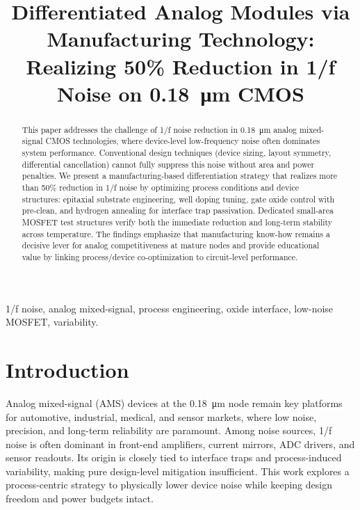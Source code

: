 \documentclass[conference]{IEEEtran}
\title{Differentiated Analog Modules via Manufacturing Technology:\\
Realizing 50\% Reduction in 1/f Noise on \SI{0.18}{\micro\meter} CMOS}
\author{
\IEEEauthorblockN{Shinichi Samizo}
\IEEEauthorblockA{Independent Semiconductor Researcher\\
Project Design Hub, Samizo-AITL\\
\textit{Email:} \href{mailto:shin3t72@gmail.com}{shin3t72@gmail.com}\quad
\textit{GitHub:} \href{https://github.com/Samizo-AITL}{Samizo-AITL}}
}
\begin{document}
\maketitle

\begin{abstract}
This paper addresses the challenge of 1/f noise reduction in \SI{0.18}{\micro\meter} analog mixed-signal CMOS technologies, where device-level low-frequency noise often dominates system performance. Conventional design techniques (device sizing, layout symmetry, differential cancellation) cannot fully suppress this noise without area and power penalties. We present a manufacturing-based differentiation strategy that realizes more than 50\% reduction in 1/f noise by optimizing process conditions and device structures: epitaxial substrate engineering, well doping tuning, gate oxide control with pre-clean, and hydrogen annealing for interface trap passivation. Dedicated small-area MOSFET test structures verify both the immediate reduction and long-term stability across temperature. The findings emphasize that manufacturing know-how remains a decisive lever for analog competitiveness at mature nodes and provide educational value by linking process/device co-optimization to circuit-level performance.
\end{abstract}

\begin{IEEEkeywords}
1/f noise, analog mixed-signal, process engineering, oxide interface, low-noise MOSFET, variability.
\end{IEEEkeywords}

\section{Introduction}
Analog mixed-signal (AMS) devices at the \SI{0.18}{\micro\meter} node remain key platforms for automotive, industrial, medical, and sensor markets, where low noise, precision, and long-term reliability are paramount. Among noise sources, 1/f noise is often dominant in front-end amplifiers, current mirrors, ADC drivers, and sensor readouts. Its origin is closely tied to interface traps and process-induced variability, making pure design-level mitigation insufficient. This work explores a process-centric strategy to physically lower device noise while keeping design freedom and power budgets intact.

\end{document}
